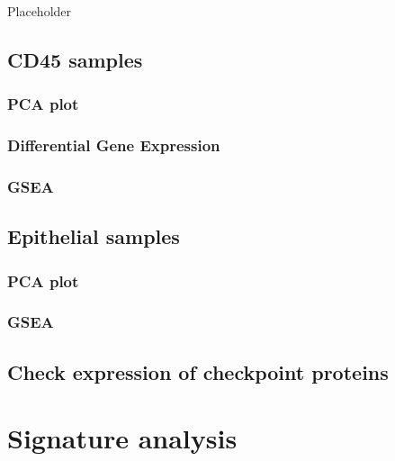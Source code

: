 \documentclass[
]{book}
\begin{document}
Placeholder

\hypertarget{cd45-samples-1}{%
\section{CD45 samples}\label{cd45-samples-1}}

\hypertarget{pca-plot}{%
\subsection{PCA plot}\label{pca-plot}}

\hypertarget{differential-gene-expression}{%
\subsection{Differential Gene Expression}\label{differential-gene-expression}}

\hypertarget{gsea-1}{%
\subsection{GSEA}\label{gsea-1}}

\hypertarget{epithelial-samples-1}{%
\section{Epithelial samples}\label{epithelial-samples-1}}

\hypertarget{pca-plot-1}{%
\subsection{PCA plot}\label{pca-plot-1}}

\hypertarget{gsea-2}{%
\subsection{GSEA}\label{gsea-2}}

\hypertarget{check-expression-of-checkpoint-proteins}{%
\section{Check expression of checkpoint proteins}\label{check-expression-of-checkpoint-proteins}}

\hypertarget{signature-analysis}{%
\chapter{Signature analysis}\label{signature-analysis}}
\end{document}
